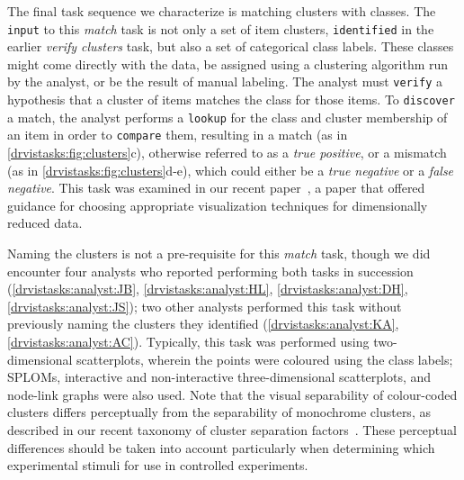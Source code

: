 The final task sequence we characterize is matching clusters with classes. 
The {\tt input} to this {\it match} task is not only a set of item clusters, {\tt identified} in the earlier {\it verify clusters} task, but also a set of categorical class labels.
These classes might come directly with the data, be assigned using a clustering algorithm run by the analyst, or be the result of manual labeling. 
The analyst must {\tt verify} a hypothesis that a cluster of items matches the class for those items. 
To {\tt discover} a match, the analyst performs a {\tt lookup} for the class and cluster membership of an item in order to {\tt compare} them, resulting in a match (as in \autoref{drvistasks:fig:clusters}c), otherwise referred to as a {\it true positive}, or a mismatch (as in \autoref{drvistasks:fig:clusters}d-e), which could either be a {\it true negative} or a {\it false negative}.
This task was examined in our recent paper~\cite{Sedlmair2013}, a paper that offered guidance for choosing appropriate visualization techniques for dimensionally reduced data.

Naming the clusters is not a pre-requisite for this {\it match} task, though we did encounter four analysts who reported performing both tasks in succession (\ref{drvistasks:analyst:JB}, \ref{drvistasks:analyst:HL}, \ref{drvistasks:analyst:DH}, \ref{drvistasks:analyst:JS}); two other analysts performed this task without previously naming the clusters they identified (\ref{drvistasks:analyst:KA}, \ref{drvistasks:analyst:AC}).
Typically, this task was performed using two-dimensional scatterplots, wherein the points were coloured using the class labels; \ac{SPLOM}s, interactive and non-interactive three-dimensional scatterplots, and node-link graphs were also used.
Note that the visual separability of colour-coded clusters differs perceptually from the separability of monochrome clusters, as described in our recent taxonomy of cluster separation factors~\cite{Sedlmair2012a}. 
These perceptual differences should be taken into account particularly when determining which experimental stimuli for use in controlled experiments.

